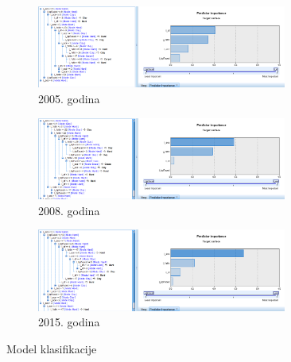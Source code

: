 \documentclass[a4paper]{article}
\begin{document}
\begin{figure}[H]
	\begin{subfigure}[h]{\textwidth}
		\begin{center}
			\includegraphics[width=0.9\textwidth]{Klasifikacija/C50/Model_Surface2005.png}
		\end{center}
		\caption{2005. godina}
		\label{fig:ModelKlasifikacijaC502005}
	\end{subfigure}
	
	\vspace{0.5cm}
	\begin{subfigure}[h]{\textwidth}
		\begin{center}
			\includegraphics[width=0.9\textwidth]{Klasifikacija/C50/Model_Surface2008.png}
		\end{center}
		\caption{2008. godina}
		\label{fig:ModelKlasifikacijaC502008}
	\end{subfigure}
	
	\vspace{0.5cm}
	\begin{subfigure}[h]{\textwidth}
		\begin{center}
			\includegraphics[width=0.9\textwidth]{Klasifikacija/C50/Model_Surface2015.png}
		\end{center}
		\caption{2015. godina}
		\label{fig:ModelKlasifikacijaC502015}
	\end{subfigure}
	
	\caption{Model klasifikacije}
	\label{fig:ModelKlasifikacijaC50}
\end{figure}
\end{document}
